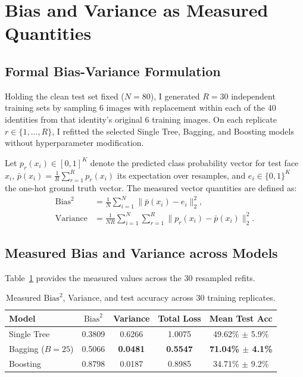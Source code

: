 \documentclass[10pt,twocolumn,letterpaper]{article}
\begin{document}
\section{Bias and Variance as Measured Quantities}
\label{sec:q3}

\subsection{Formal Bias-Variance Formulation}
Holding the clean test set fixed ($N=80$), I generated $R = 30$ independent training sets by sampling 6 images with replacement within each of the 40 identities from that identity's original 6 training images. On each replicate $r \in \{1, \dots, R\}$, I refitted the selected Single Tree, Bagging, and Boosting models without hyperparameter modification.

Let $p_r(x_i) \in [0, 1]^K$ denote the predicted class probability vector for test face $x_i$, $\bar{p}(x_i) = \frac{1}{R} \sum_{r=1}^R p_r(x_i)$ its expectation over resamples, and $e_i \in \{0, 1\}^K$ the one-hot ground truth vector. The measured vector quantities are defined as:
\begin{align}
    \text{Bias}^2 &= \frac{1}{N} \sum_{i=1}^N \|\bar{p}(x_i) - e_i\|_2^2, \\
    \text{Variance} &= \frac{1}{NR} \sum_{i=1}^N \sum_{r=1}^R \|p_r(x_i) - \bar{p}(x_i)\|_2^2.
\end{align}

\subsection{Measured Bias and Variance across Models}
Table~\ref{tab:q3_part_a} provides the measured values across the 30 resampled refits.

\begin{table}[h]
\centering
\small
\caption{Measured $\text{Bias}^2$, Variance, and test accuracy across 30 training replicates.}
\label{tab:q3_part_a}
\begin{tabular}{lcccc}
\toprule
Model & $\text{Bias}^2$ & Variance & Total Loss & Mean Test Acc \\
\midrule
Single Tree & 0.3809 & 0.6266 & 1.0075 & 49.62\% $\pm$ 5.9\% \\
Bagging ($B=25$) & 0.5066 & \textbf{0.0481} & \textbf{0.5547} & \textbf{71.04\% $\pm$ 4.1\%} \\
Boosting & 0.8798 & 0.0187 & 0.8985 & 34.71\% $\pm$ 9.2\% \\
\bottomrule
\end{tabular}
\end{table}
\end{document}
